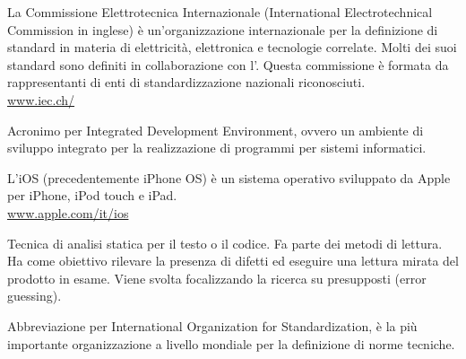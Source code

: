 La Commissione Elettrotecnica Internazionale (International Electrotechnical Commission in inglese) è un'organizzazione internazionale per la definizione di standard in materia di elettricità, elettronica e tecnologie correlate. Molti dei suoi standard sono definiti in collaborazione con l'. Questa commissione è formata da rappresentanti di enti di standardizzazione nazionali riconosciuti.\\
\url{www.iec.ch/}

Acronimo per Integrated Development Environment, ovvero un ambiente di sviluppo integrato per la realizzazione di programmi per sistemi informatici.

L'iOS (precedentemente iPhone OS) è un sistema operativo sviluppato da Apple per iPhone, iPod touch e iPad.\\
\url{www.apple.com/it/ios}

Tecnica di analisi statica per il testo o il codice. Fa parte dei metodi di lettura. Ha come obiettivo rilevare la presenza di difetti ed eseguire una lettura mirata del prodotto in esame. Viene svolta focalizzando la ricerca su presupposti (error guessing).

Abbreviazione per International Organization for Standardization, è la più importante organizzazione a livello mondiale per la definizione di norme tecniche.
\clearpage